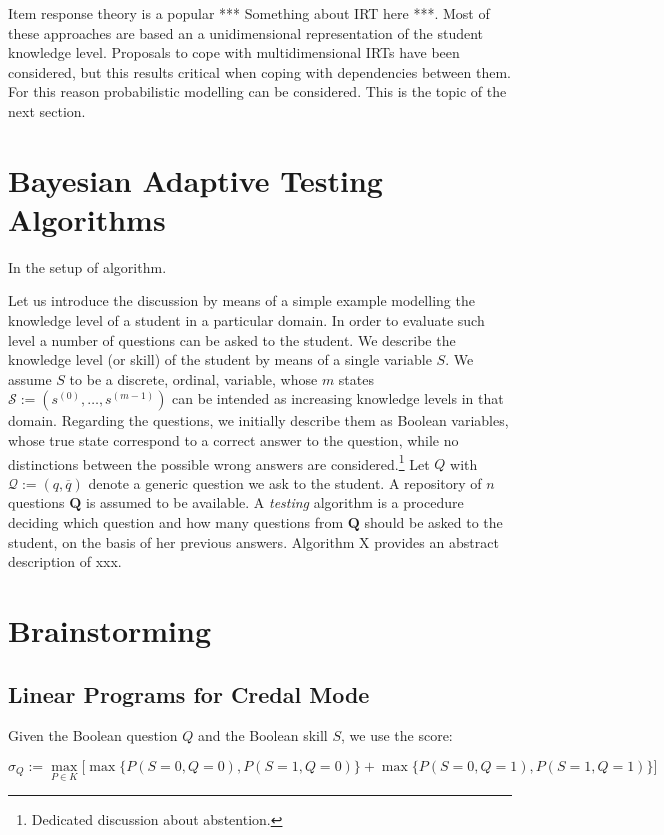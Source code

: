 \documentclass[runningheads]{llncs}
\begin{document}
Item response theory is a popular *** Something about IRT here ***. Most of these approaches are based an a unidimensional representation of the student knowledge level. Proposals to cope with multidimensional IRTs have been considered, but this results critical when coping with dependencies between them. For this reason probabilistic modelling can be considered. This is the topic of the next section.

\section{Bayesian Adaptive Testing Algorithms}
In the setup of algorithm.

Let us introduce the discussion by means of a simple example modelling the knowledge level of a student in a particular domain. In order to evaluate such level a number of questions can be asked to the student. We describe the knowledge level (or skill) of the student by means of a single variable $S$. We assume $S$ to be a discrete, ordinal, variable, whose $m$ states $\mathcal{S}:=(s^{(0)},\ldots,s^{(m-1)})$ can be intended as increasing knowledge levels in that domain. Regarding the questions, we initially describe them as Boolean variables, whose true state correspond to a correct answer to the question, while no distinctions between the possible wrong answers are considered.\footnote{Dedicated discussion about abstention.} Let $Q$ with $\mathcal{Q}:=(q,\overline{q})$ denote a generic question we ask to the student. A repository of $n$ questions $\bm{Q}$ is assumed to be available. A \emph{testing} algorithm is a procedure deciding which question and how many questions from $\bm{Q}$ should be asked to the student, on the basis of her previous answers. Algorithm X provides an abstract description of xxx.


	\section{Brainstorming}
	
	\subsection{Linear Programs for Credal Mode}
	
	Given the Boolean question $Q$ and the Boolean skill $S$, we use the score:
	
	\begin{equation}
		\sigma_Q := \max_{P\in K} \bigl[ 
		\max \{ P(S=0,Q=0) , P(S=1,Q=0) \}  + \max \{ P(S=0,Q=1),P(S=1,Q=1)\}
		\bigr]
	\end{equation}
	
\end{document}
